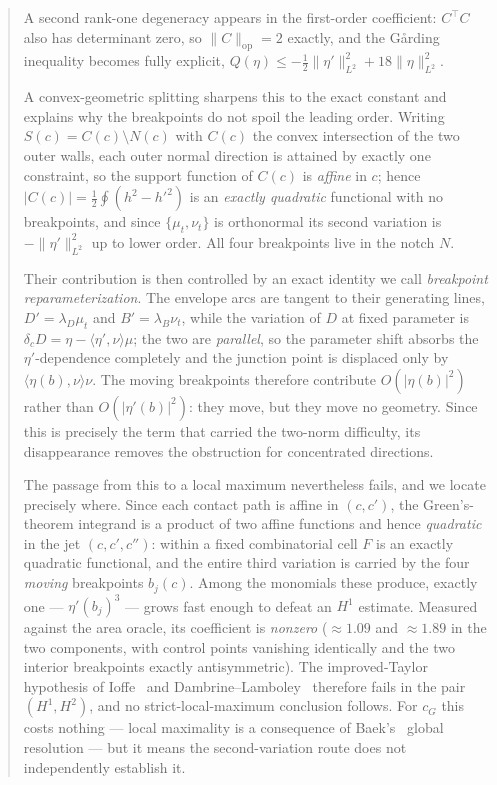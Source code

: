 \documentclass[11pt]{amsart}
\theoremstyle{plain}
\theoremstyle{definition}
\newcommand{\cG}{c_{G}}
\begin{document}
\begin{abstract}
A second rank-one degeneracy appears in the first-order coefficient:
$C^{\top}C$ also has determinant zero, so $\|C\|_{\mathrm{op}}=2$
exactly, and the G\aa rding inequality becomes fully explicit,
$Q(\eta)\leq-\tfrac12\|\eta'\|^{2}_{L^{2}}+18\|\eta\|^{2}_{L^{2}}$.

A convex-geometric splitting sharpens this to the exact constant and
explains why the breakpoints do not spoil the leading order.  Writing
$S(c)=C(c)\setminus N(c)$ with $C(c)$ the convex intersection of the two
outer walls, each outer normal direction is attained by exactly one
constraint, so the support function of $C(c)$ is \emph{affine} in $c$;
hence $|C(c)|=\tfrac12\oint(h^{2}-h'^{2})$ is an \emph{exactly quadratic}
functional with no breakpoints, and since $\{\mu_{t},\nu_{t}\}$ is
orthonormal its second variation is $-\|\eta'\|^{2}_{L^{2}}$ up to lower
order.  All four breakpoints live in the notch $N$.

Their contribution is then controlled by an exact identity we call
\emph{breakpoint reparameterization}.  The envelope arcs are tangent to
their generating lines, $D'=\lambda_{D}\mu_{t}$ and
$B'=\lambda_{B}\nu_{t}$, while the variation of $D$ at fixed parameter
is $\delta_{c}D = \eta-\langle\eta',\nu\rangle\mu$; the two are
\emph{parallel}, so the parameter shift absorbs the $\eta'$-dependence
completely and the junction point is displaced only by
$\langle\eta(b),\nu\rangle\nu$.  The moving breakpoints therefore
contribute $O(|\eta(b)|^{2})$ rather than $O(|\eta'(b)|^{2})$: they move,
but they move no geometry.  Since this is precisely the term that
carried the two-norm difficulty, its disappearance removes the
obstruction for concentrated directions.

The passage from this to a local maximum nevertheless fails, and we
locate precisely where.  Since each contact path is affine in
$(c,c')$, the Green's-theorem integrand is a product of two affine
functions and hence \emph{quadratic} in the jet $(c,c',c'')$: within
a fixed combinatorial cell $F$ is an exactly quadratic functional,
and the entire third variation is carried by the four \emph{moving}
breakpoints $b_{j}(c)$.  Among the monomials these produce, exactly
one --- $\eta'(b_{j})^{3}$ --- grows fast enough to defeat an $H^{1}$
estimate.  Measured against the area oracle, its coefficient is
\emph{nonzero} ($\approx1.09$ and $\approx1.89$ in the two
components, with control points vanishing identically and the two
interior breakpoints exactly antisymmetric).  The improved-Taylor
hypothesis of Ioffe~\cite{Ioffe1979} and
Dambrine--Lamboley~\cite{DambrineLamboley} therefore fails in the
pair $(H^{1},H^{2})$, and no strict-local-maximum conclusion follows.
For $\cG$ this costs nothing --- local maximality is a consequence of
Baek's~\cite{Baek2024} global resolution --- but it means the
second-variation route does not independently establish it.


\end{abstract}
\end{document}
